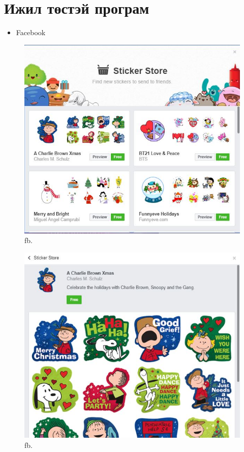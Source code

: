 \documentclass[12pt]{article}
\begin{document}
	\section{Ижил төстэй програм}
	\begin{itemize}
	\item Facebook
	\end{itemize}
	\begin{figure}
	\includegraphics[width=\linewidth]{store.jpg}
	\caption{fb.}
	\label{fig:bpmn1}
	\end{figure}
	\begin{figure}
	\includegraphics[width=\linewidth]{review.jpg}
	\caption{fb.}
	\label{fig:bpmn1}
\end{figure}
\end{document}
